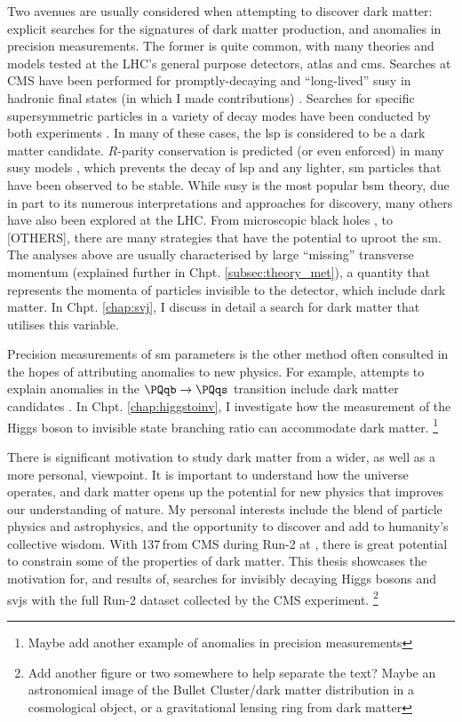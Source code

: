 Two avenues are usually considered when attempting to discover dark matter: explicit searches for the signatures of dark matter production, and anomalies in precision measurements. The former is quite common, with many theories and models tested at the LHC's general purpose detectors, \acrshort{atlas} and \acrshort{cms}. Searches at CMS have been performed for promptly-decaying and ``long-lived'' \acrlong{susy} in hadronic final states (in which I made contributions) \cite{CMS-PAPER-SUS-15-005-published,SUS16038published}. Searches for specific supersymmetric particles in a variety of decay modes have been conducted by both experiments \cite{CANEPA2019100033}. In many of these cases, the \acrfull{lsp} is considered to be a dark matter candidate. $R$-parity conservation is predicted (or even enforced) in many \acrshort{susy} models \cite{Martin:1997ns}, which prevents the decay of \acrshort{lsp} and any lighter, \acrlong{sm} particles that have been observed to be stable. While \acrlong{susy} is the most popular \acrshort{bsm} theory, due in part to its numerous interpretations and approaches for discovery, many others have also been explored at the LHC. From microscopic black holes \cite{Khachatryan:2010wx}, to [OTHERS], there are many strategies that have the potential to uproot the \acrlong{sm}. The analyses above are usually characterised by large ``missing'' transverse momentum (explained further in Chpt. \ref{subsec:theory_met}), a quantity that represents the momenta of particles invisible to the detector, which include dark matter. In Chpt. \ref{chap:svj}, I discuss in detail a search for dark matter that utilises this variable.

Precision measurements of \acrlong{sm} parameters is the other method often consulted in the hopes of attributing anomalies to new physics. For example, attempts to explain anomalies in the $\Pqb \rightarrow \Pqs$ transition include dark matter candidates \cite{anomalies_b_s_dark_matter,another_b_s_anomaly_paper}. In Chpt. \ref{chap:higgstoinv}, I investigate how the measurement of the Higgs boson to invisible state branching ratio can accommodate dark matter. \footnote{Maybe add another example of anomalies in precision measurements}

There is significant motivation to study dark matter from a wider, as well as a more personal, viewpoint. It is important to understand how the universe operates, and dark matter opens up the potential for new physics that improves our understanding of nature. My personal interests include the blend of particle physics and astrophysics, and the opportunity to discover and add to humanity's collective wisdom. With 137\,\fbinv from CMS during Run-2 at \comruntwo, there is great potential to constrain some of the properties of dark matter. This thesis showcases the motivation for, and results of, searches for invisibly decaying Higgs bosons and \glspl{svj} with the full Run-2 dataset collected by the CMS experiment. \footnote{Add another figure or two somewhere to help separate the text? Maybe an astronomical image of the Bullet Cluster/dark matter distribution in a cosmological object, or a gravitational lensing ring from dark matter}

